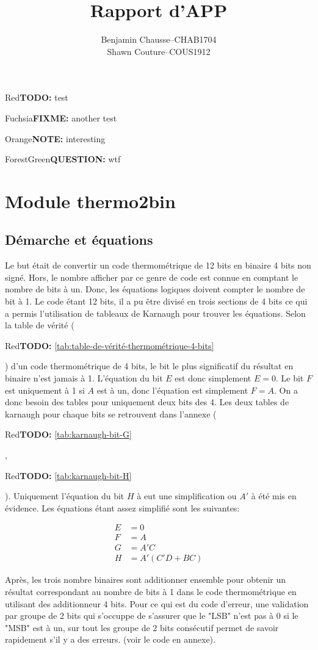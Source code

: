 \documentclass[a11paper]{article}
\title{Rapport d'APP}
\author{
  \addtolength{\tabcolsep}{-0.4em}
  \begin{tabular}{rcl} %
      Benjamin Chausse & -- & CHAB1704 \\
      Shawn Couture    & -- & COUS1912 \\
  \end{tabular}
}
\newcommand{\todo}[1]{\begin{color}{Red}\textbf{TODO:} #1\end{color}}
\newcommand{\note}[1]{\begin{color}{Orange}\textbf{NOTE:} #1\end{color}}
\newcommand{\fixme}[1]{\begin{color}{Fuchsia}\textbf{FIXME:} #1\end{color}}
\newcommand{\question}[1]{\begin{color}{ForestGreen}\textbf{QUESTION:} #1\end{color}}
\begin{document}
\maketitle
\newpage
\tableofcontents
\newpage

\todo{test} \fixme{another test} \note{interesting} \question{wtf}

\section{Module thermo2bin}

\subsection{Démarche et équations}
Le but était de convertir un code thermométrique de 12 bits en binaire 4 bits non signé. Hors, le nombre afficher par ce genre de code
est connue en comptant le nombre de bits à un. Donc, les équations logiques doivent compter le nombre de bit à 1. Le code étant 12 bits,
il a pu être divisé en trois sections de 4 bits ce qui a permis l'utilisation de tableaux de Karnaugh pour trouver les équations. Selon
la table de vérité (\todo{\ref{tab:table-de-vérité-thermométrique-4-bits}}) d'un code thermométrique de 4 bits, le bit le plus significatif
du résultat en binaire n'est jamais à 1. L'équation du bit $E$ est donc simplement $E=0$. Le bit $F$ est uniquement à 1 si $A$ est à un, donc
l'équation est simplement $F=A$. On a donc besoin des tables pour uniquement deux bits des 4. Les deux tables de karnaugh pour chaque bits
se retrouvent dans l'annexe (\todo{\ref{tab:karnaugh-bit-G}}, \todo{\ref{tab:karnaugh-bit-H}}). Uniquement l'équation du bit $H$ à eut une
simplification ou $A'$ à été mis en évidence. Les équations étant assez simplifié sont les suivantes:

\begin{align}
  E &= 0 \\ F &= A \\ G &= A'C \\ H &= A'(C'D+BC)
\end{align}

Après, les trois nombre binaires sont additionner ensemble pour obtenir un résultat correspondant au nombre de bits à 1 dans le code
thermométrique en utilisant des additionneur 4 bits. Pour ce qui est du code d'erreur, une validation par groupe de 2 bits qui s'occuppe
de s'assurer que le "LSB" n'est pas à 0 si le "MSB" est à un, sur tout les groupe de 2 bits consécutif permet de savoir rapidement s'il
y a des erreurs. (voir le code en annexe).
\end{document}
